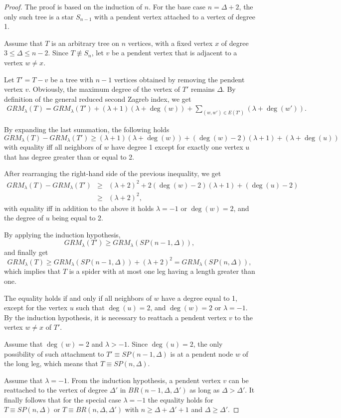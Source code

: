 \documentclass[preprint,12pt]{elsarticle}
\begin{document}
\begin{proof}
The proof is based on the induction of $n$. For the base case $n = \Delta + 2$, the only such tree is a star $S_{n-1}$ with a pendent vertex attached to a vertex of degree 1.

Assume that $T$ is an arbitrary tree on $n$ vertices, with a fixed vertex $x$ of degree $3 \leq \Delta \leq n - 2$. Since $T \not \equiv S_n$, let $v$ be a pendent vertex that is adjacent to a vertex $w \neq x$.

Let $T' = T - v$ be a tree with $n - 1$ vertices obtained by removing the pendent vertex $v$. Obviously, the maximum degree of the vertex of $T'$ remains $\Delta$. By definition of the general reduced second Zagreb index, we get
\begin{eqnarray}
\label{GRM_leaf}
GRM_{\lambda}(T) = GRM_{\lambda}(T') + (\lambda+1)(\lambda+\deg(w)) + \sum_{(w, w') \in E(T')} (\lambda + \deg(w')).
\end{eqnarray}

By expanding the last summation, the following holds
$$
 GRM_{\lambda}(T) - GRM_{\lambda}(T') \geq (\lambda+1)(\lambda+\deg(w)) + (\deg(w)-2)(\lambda+1)+(\lambda+\deg(u))
$$
with equality iff all neighbors of $w$ have degree 1 except for exactly one vertex $u$ that has degree greater than or equal to 2.

After rearranging the right-hand side of the previous inequality, we get
 \begin{eqnarray*}
 GRM_{\lambda}(T) - GRM_{\lambda}(T') &\geq&
 (\lambda+2)^2 + 2 (\deg(w)-2)(\lambda+1)+(\deg(u)-2) \\
 &\geq& (\lambda+2)^2,
\end{eqnarray*}
with equality iff in addition to the above it holds $\lambda=-1$ or $\deg(w)=2$, and the degree of $u$ being equal to 2.

By applying the induction hypothesis,
$$
GRM_{\lambda}(T') \geq GRM_{\lambda}(SP(n-1, \Delta)),
$$
and finally get
$$
GRM_{\lambda}(T) \geq GRM_{\lambda}(SP(n-1, \Delta)) + (\lambda+2)^2 = GRM_{\lambda}(SP(n, \Delta)),
$$
which implies that $T$ is a spider with at most one leg having a length greater than one.

The equality holds if and only if all neighbors of $w$ have a degree equal to 1, except for the vertex $u$ such that $\deg(u) = 2$, and $\deg(w) = 2$ or $\lambda = -1$. By the induction hypothesis, it is necessary to reattach a pendent vertex $v$ to the vertex $w \neq x$ of $T'$.

Assume that $\deg(w) = 2$ and $\lambda > -1$. Since $\deg(u) = 2$, the only possibility of such attachment to $T' \equiv SP (n-1, \Delta)$ is at a pendent node $w$ of the long leg, which means that $T \equiv SP (n, \Delta)$. 

Assume that $\lambda = -1$. From the induction hypothesis, a pendent vertex $v$ can be reattached to the vertex of degree $\Delta'$ in $BR(n - 1, \Delta, \Delta')$ as long as $\Delta > \Delta'$. It finally follows that for the special case $\lambda = -1$ the equality holds for $T \equiv SP(n, \Delta)$ or $T \equiv BR(n, \Delta, \Delta')$ with $n \geq \Delta + \Delta' + 1$ and $\Delta \geq \Delta'$.
\end{proof}
\end{document}
